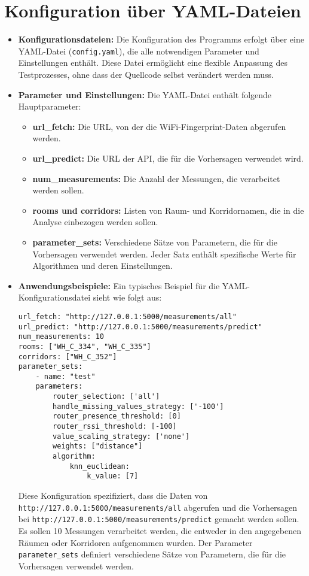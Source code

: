 \section{Konfiguration über YAML-Dateien}
\begin{itemize}
    \item \textbf{Konfigurationsdateien:} Die Konfiguration des Programms erfolgt über eine YAML-Datei (\texttt{config.yaml}), die alle notwendigen Parameter und Einstellungen enthält. Diese Datei ermöglicht eine flexible Anpassung des Testprozesses, ohne dass der Quellcode selbst verändert werden muss.

    \item \textbf{Parameter und Einstellungen:} Die YAML-Datei enthält folgende Hauptparameter:
        \begin{itemize}
            \item \textbf{url\_fetch:} Die URL, von der die WiFi-Fingerprint-Daten abgerufen werden.
            \item \textbf{url\_predict:} Die URL der API, die für die Vorhersagen verwendet wird.
            \item \textbf{num\_measurements:} Die Anzahl der Messungen, die verarbeitet werden sollen.
            \item \textbf{rooms und corridors:} Listen von Raum- und Korridornamen, die in die Analyse einbezogen werden sollen.
            \item \textbf{parameter\_sets:} Verschiedene Sätze von Parametern, die für die Vorhersagen verwendet werden. Jeder Satz enthält spezifische Werte für Algorithmen und deren Einstellungen.
        \end{itemize}

    \item \textbf{Anwendungsbeispiele:} Ein typisches Beispiel für die YAML-Konfigurationsdatei sieht wie folgt aus:
        \begin{lstlisting}[caption=.yaml Konfigurationsdatei, label={lst:code_yaml}]
url_fetch: "http://127.0.0.1:5000/measurements/all"
url_predict: "http://127.0.0.1:5000/measurements/predict"
num_measurements: 10
rooms: ["WH_C_334", "WH_C_335"]
corridors: ["WH_C_352"]
parameter_sets:
    - name: "test"
    parameters:
        router_selection: ['all']
        handle_missing_values_strategy: ['-100']
        router_presence_threshold: [0]
        router_rssi_threshold: [-100]
        value_scaling_strategy: ['none']
        weights: ["distance"]
        algorithm:
            knn_euclidean:
                k_value: [7]
        \end{lstlisting}
        Diese Konfiguration spezifiziert, dass die Daten von \texttt{http://127.0.0.1:5000/\discretionary{}{}{}measure\discretionary{}{}{}ments/\discretionary{}{}{}all} abgerufen und die Vorhersagen bei \texttt{http://127.0.0.1:5000/\discretionary{}{}{}measure\discretionary{}{}{}ments/\discretionary{}{}{}predict} gemacht werden sollen. Es sollen 10 Messungen verarbeitet werden, die entweder in den angegebenen Räumen oder Korridoren aufgenommen wurden. Der Parameter \texttt{parameter\_sets} definiert verschiedene Sätze von Parametern, die für die Vorhersagen verwendet werden.
\end{itemize}

